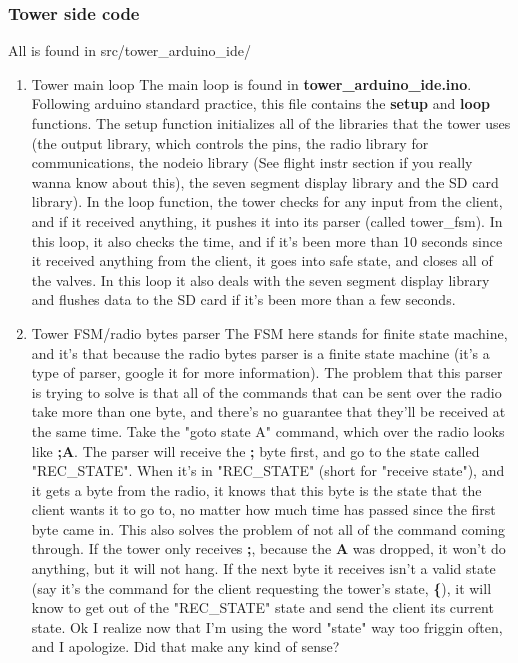 \documentclass[11pt]{article}
\begin{document}
\subsubsection{Tower side code}
\label{sec:orgc57cb16}

All is found in src/tower\_arduino\_ide/

\begin{enumerate}
\item Tower main loop
\label{sec:orgceb1bcd}
The main loop is found in \textbf{tower\_arduino\_ide.ino}. Following arduino standard
practice, this file contains the \textbf{setup} and \textbf{loop} functions. The setup
function initializes all of the libraries that the tower uses (the output
library, which controls the pins, the radio library for communications, the
nodeio library (See flight instr section if you really wanna know about this),
the seven segment display library and the SD card library). In the loop
function, the tower checks for any input from the client, and if it received
anything, it pushes it into its parser (called tower\_fsm). In this loop, it also
checks the time, and if it's been more than 10 seconds since it received
anything from the client, it goes into safe state, and closes all of the
valves. In this loop it also deals with the seven segment display library and
flushes data to the SD card if it's been more than a few seconds.

\item Tower FSM/radio bytes parser
\label{sec:orga86f2a7}
The FSM here stands for finite state machine, and it's that because the radio
bytes parser is a finite state machine (it's a type of parser, google it for
more information). The problem that this parser is trying to solve is that all
of the commands that can be sent over the radio take more than one byte, and
there's no guarantee that they'll be received at the same time. Take the "goto
state A" command, which over the radio looks like \textbf{;A}. The parser will receive
the \textbf{;} byte first, and go to the state called "REC\_STATE". When it's in
"REC\_STATE" (short for "receive state"), and it gets a byte from the radio, it
knows that this byte is the state that the client wants it to go to, no matter
how much time has passed since the first byte came in. This also solves the
problem of not all of the command coming through. If the tower only receives
\textbf{;}, because the \textbf{A} was dropped, it won't do anything, but it will not hang. If
the next byte it receives isn't a valid state (say it's the command for the
client requesting the tower's state, \textbf{\{}), it will know to get out of the
"REC\_STATE" state and send the client its current state. Ok I realize now that
I'm using the word "state" way too friggin often, and I apologize. Did that make
any kind of sense?



\end{enumerate}
\end{document}
